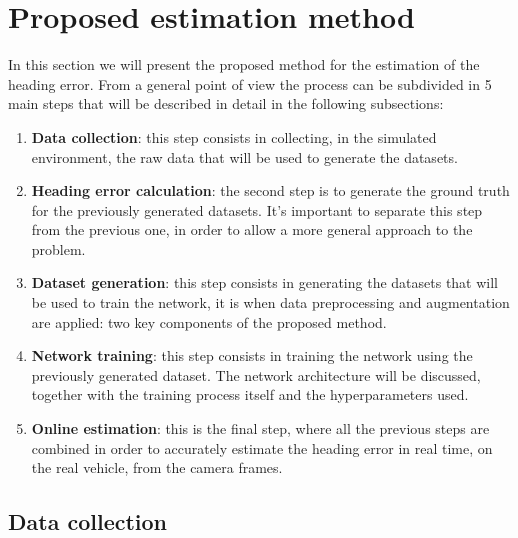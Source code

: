 \documentclass[a4paper,12pt,sort&compress]{article}
\begin{document}
\newpage

\section{Proposed estimation method}
In this section we will present the proposed method for the estimation of the heading error. From a
general point of view the process can be subdivided in 5 main steps that will be described in detail
in the following subsections:
\begin{enumerate}
    \item \textbf{Data collection}: this step consists in collecting, in the simulated environment,
    the raw data that will be used to generate the datasets.
    \item \textbf{Heading error calculation}: the second step is to generate the ground truth for the
    previously generated datasets. It's important to separate this step from the previous one, in
    order to allow a more general approach to the problem.
    \item \textbf{Dataset generation}: this step consists in generating the datasets that will be used to
    train the network, it is when data preprocessing and augmentation are applied: two key components
    of the proposed method.
    \item \textbf{Network training}: this step consists in training the network using the previously
    generated dataset. The network architecture will be discussed, together with the training
    process itself and the hyperparameters used. 
    \item \textbf{Online estimation}: this is the final step, where all the previous steps are combined in
    order to accurately estimate the heading error in real time, on the real vehicle, from the
    camera frames.
\end{enumerate}

\pagebreak

\subsection{Data collection} \label{sec:data_collection}
\end{document}
